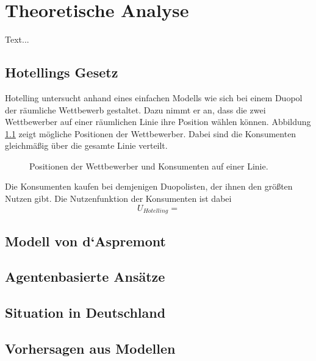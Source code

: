 \chapter{Theoretische Analyse}\label{Kap-Theorie}

\noindent
Text...

\section{Hotellings Gesetz}\label{Sec-Hotelling}

Hotelling \citep{hotelling1929} untersucht anhand eines einfachen Modells wie sich bei einem Duopol der räumliche Wettbewerb gestaltet. Dazu nimmt er an, dass die zwei Wettbewerber auf einer räumlichen Linie ihre Position wählen können. Abbildung \ref{Fig-Linearer-Wettbewerb} zeigt mögliche Positionen der Wettbewerber. Dabei sind die Konsumenten gleichmäßig über die gesamte Linie verteilt.

\begin{figure}[htb]
	\centering
	\caption{Positionen der Wettbewerber und Konsumenten auf einer Linie.}
	\label{Fig-Linearer-Wettbewerb}
\end{figure}

Die Konsumenten kaufen bei demjenigen Duopolisten, der ihnen den größten Nutzen gibt. Die Nutzenfunktion der Konsumenten ist dabei
\begin{equation}
U_{Hotelling} = 
\end{equation}

\section{Modell von d‘Aspremont}\label{Sec-Aspremont}

\section{Agentenbasierte Ansätze}\label{Sec-ABM}

\section{Situation in Deutschland}\label{Sec-Deutschland}

\section{Vorhersagen aus Modellen}\label{Sec-Vorhersagen}
